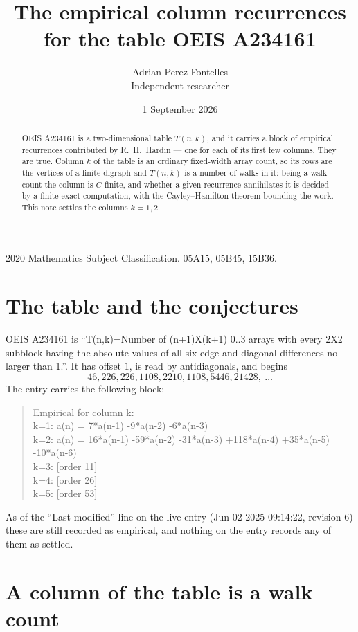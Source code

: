 \documentclass[11pt,a4paper]{article}
\title{The empirical column recurrences for the table OEIS A234161}
\author{Adrian Perez Fontelles\\ \small Independent researcher}
\date{1 September 2026}
\theoremstyle{plain}
\theoremstyle{definition}
\begin{document}
\maketitle

\begin{abstract}
OEIS A234161 is a two-dimensional table $T(n,k)$, and it carries a block of empirical
recurrences contributed by R.~H.~Hardin --- one for each of its first few columns. They are
true. Column $k$ of the table is an ordinary fixed-width array count, so its rows are the
vertices of a finite digraph and $T(n,k)$ is a number of walks in it; being a walk count the
column is $C$-finite, and whether a given recurrence annihilates it is decided by a finite
exact computation, with the Cayley--Hamilton theorem bounding the work. This note settles the columns $k=1, 2$.
\end{abstract}

\noindent\small 2020 Mathematics Subject Classification. 05A15, 05B45, 15B36.\normalsize

\section{The table and the conjectures}

OEIS A234161 is ``T(n,k)=Number of (n+1)X(k+1) 0..3 arrays with every 2X2 subblock having the absolute values of all six edge and diagonal differences no larger than 1.''. It has offset $1$, is
read by antidiagonals, and begins
\[
46, 226, 226, 1108, 2210, 1108, 5446, 21428,\ \dots
\]
The entry carries the following block:
\begin{quote}\small
Empirical for column k:\\
k=1: a(n) = 7*a(n-1) -9*a(n-2) -6*a(n-3)\\
k=2: a(n) = 16*a(n-1) -59*a(n-2) -31*a(n-3) +118*a(n-4) +35*a(n-5) -10*a(n-6)\\
k=3: [order 11]\\
k=4: [order 26]\\
k=5: [order 53]\\
\end{quote}
As of the ``Last modified'' line on the live entry (Jun 02 2025 09:14:22, revision 6) these are still
recorded as empirical, and nothing on the entry records any of them as settled.

\section{A column of the table is a walk count}
\end{document}
